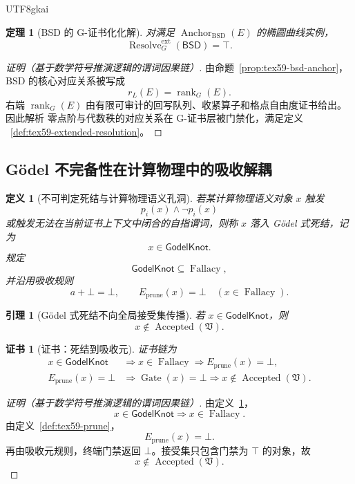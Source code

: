 \documentclass[12pt]{article}
\newtheorem{definition}{定义}[section]
\newtheorem{theorem}{定理}[section]
\newtheorem{lemma}{引理}[section]
\newtheorem{Certificate}{证书}[section]
\newcommand{\Vsys}{\mathfrak V}
\DeclareMathOperator{\Accepted}{Accepted}
\DeclareMathOperator{\Fallacy}{Fallacy}
\DeclareMathOperator{\Resolve}{Resolve}
\DeclareMathOperator{\Rank}{rank}
\DeclareMathOperator{\Gate}{Gate}
\DeclareMathOperator{\Anchor}{Anchor}
\begin{document}
\begin{CJK*}{UTF8}{gkai}
\begin{theorem}[BSD 的 G-证书化化解]
\label{thm:tex59-bsd-resolution}
对满足 \(\Anchor_{\mathrm{BSD}}(E)\) 的椭圆曲线实例，
\[
  \Resolve_G^{\mathrm{ext}}(\mathsf{BSD})=\top.
\]
\end{theorem}

\begin{proof}[证明（基于数学符号推演逻辑的谓词因果链）]
由命题~\ref{prop:tex59-bsd-anchor}，BSD 的核心对应关系被写成
\[
  r_L(E)=\Rank_G(E).
\]
右端 \(\Rank_G(E)\) 由有限可审计的回写队列、收紧算子和格点自由度证书给出。因此解析
零点阶与代数秩的对应关系在 G-证书层被门禁化，满足定义
~\ref{def:tex59-extended-resolution}。
\end{proof}

\subsection{Gödel 不完备性在计算物理中的吸收解耦}
\label{subsec:tex59-godel-decouple}

\begin{definition}[不可判定死结与计算物理语义孔洞]
\label{def:tex59-godel-knot}
若某计算物理语义对象 \(x\) 触发
\[
  p_i(x)\wedge\neg p_i(x)
\]
或触发无法在当前证书上下文中闭合的自指谓词，则称 \(x\) 落入 Gödel 式死结，记为
\[
  x\in\mathsf{GodelKnot}.
\]
规定
\[
  \mathsf{GodelKnot}\subseteq\Fallacy,
\]
并沿用吸收规则
\[
  a+\bot=\bot,\qquad
  E_{\mathrm{prune}}(x)=\bot\quad (x\in\Fallacy).
\]
\end{definition}

\begin{lemma}[Gödel 式死结不向全局接受集传播]
\label{lem:tex59-godel-no-propagation}
若 \(x\in\mathsf{GodelKnot}\)，则
\[
  x\notin\Accepted(\Vsys).
\]
\end{lemma}

\begin{Certificate}[证书：死结到吸收元]
\label{cert:tex59-godel-no-propagation}
证书链为
\[
  \begin{aligned}
  x\in\mathsf{GodelKnot}
  &\Longrightarrow
  x\in\Fallacy
  \Longrightarrow
  E_{\mathrm{prune}}(x)=\bot,\\
  E_{\mathrm{prune}}(x)=\bot
  &\Longrightarrow
  \Gate(x)=\bot
  \Longrightarrow
  x\notin\Accepted(\Vsys).
  \end{aligned}
\]
\end{Certificate}

\begin{proof}[证明（基于数学符号推演逻辑的谓词因果链）]
由定义~\ref{def:tex59-godel-knot}，
\[
  x\in\mathsf{GodelKnot}\Rightarrow x\in\Fallacy.
\]
由定义~\ref{def:tex59-prune}，
\[
  E_{\mathrm{prune}}(x)=\bot.
\]
再由吸收元规则，终端门禁返回 \(\bot\)。接受集只包含门禁为 \(\top\) 的对象，故
\[
  x\notin\Accepted(\Vsys).
\]
\end{proof}


\end{CJK*}
\end{document}
